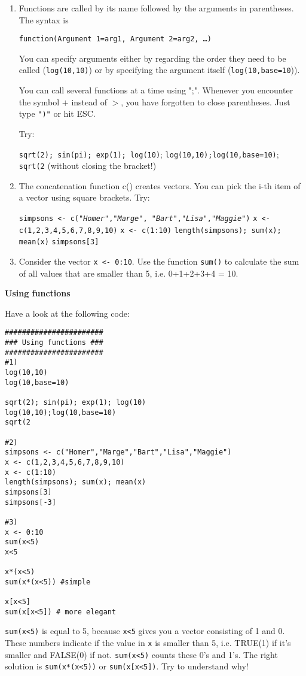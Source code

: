 \documentclass{article}
\begin{document}
\begin{enumerate}
\item Functions are called by its name followed by the arguments in parentheses. The syntax is

\texttt{function(Argument\ 1=arg1,\ Argument\ 2=arg2,\ \dots )}

You can specify arguments either by regarding the order they need to be called (\texttt{log(10,10)}) or by specifying the argument itself (\texttt{log(10,base=10})).

You can call several functions at a time using ";". Whenever you encounter the symbol $+$ instead of $>$, you have forgotten to close parentheses. Just type \texttt{")"} or hit ESC.

Try:

\texttt{sqrt(2); sin(pi); exp(1); log(10)}; \texttt{log(10,10);log(10,base=10)}; \newline
\texttt{sqrt(2} (without closing the bracket!)

\item The concatenation function c() creates vectors. You can pick the i-th item of a vector using square brackets. Try:

\texttt{simpsons <- c(\textit{"Homer"},\textit{"Marge"},\textit{%
"Bart"},\textit{"Lisa"},\textit{"Maggie"})}\newline
\texttt{x <- c(1,2,3,4,5,6,7,8,9,10)}\newline
\texttt{x <- c(1:10)}\newline
\texttt{length(simpsons); sum(x); mean(x)}\newline
\texttt{simpsons[3]}

\item Consider the vector \texttt{x <- 0:10}. Use the function \texttt{sum()} to calculate the sum of all values that are smaller than 5, i.e. 0+1+2+3+4 = 10.
\end{enumerate}

\begin{solution}
\textbf{Using functions}

Have a look at the following code:
\begin{verbatim}
#######################
### Using functions ###
#######################
#1)
log(10,10)
log(10,base=10)

sqrt(2); sin(pi); exp(1); log(10)
log(10,10);log(10,base=10)
sqrt(2

#2)
simpsons <- c("Homer","Marge","Bart","Lisa","Maggie")
x <- c(1,2,3,4,5,6,7,8,9,10)
x <- c(1:10)
length(simpsons); sum(x); mean(x)
simpsons[3]
simpsons[-3]

#3)
x <- 0:10
sum(x<5)
x<5

x*(x<5)
sum(x*(x<5)) #simple

x[x<5]
sum(x[x<5]) # more elegant
\end{verbatim}
\texttt{sum(x<5)} is equal to 5, because \texttt{x<5} gives you a vector consisting of 1 and 0. These numbers indicate if the value in \texttt{x} is smaller than 5, i.e. TRUE(1) if it's smaller and FALSE(0) if not. \texttt{sum(x<5)} counts these 0's and 1's. The right solution is \texttt{sum(x*(x<5))} or \texttt{sum(x[x<5])}. Try to understand why!

\end{solution}
\end{document}
